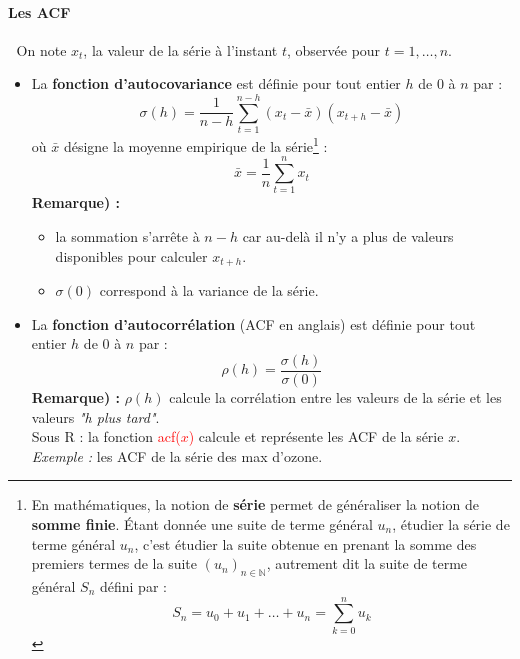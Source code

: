 \paragraph{Les ACF}\textcolor{white}{.}\newline
On note $x_{t}$, la valeur de la série à l'instant $t$, observée pour $t=1,\dots,n$.
\begin{itemize}
\item La \textbf{fonction d'autocovariance} est définie pour tout entier $h$ de $0$ à $n$ par :
$$\sigma(h) = \frac{1}{n-h} \sum_{t=1}^{n-h}(x_{t}-\bar{x})(x_{t+h}-\bar{x})$$
où $\bar{x}$ désigne la moyenne empirique de la série\footnote{
En mathématiques, la notion de \textbf{série} permet de généraliser la notion de \textbf{somme finie}.\newline
Étant donnée une suite de terme général $u_{n}$, étudier la série de terme général $u_{n}$, c'est étudier la suite obtenue en prenant la somme des premiers termes de la suite $(u_{n})_{n\in\mathbb{N}}$, autrement dit la suite de terme général $S_{n}$ défini par :
$$S_{n} = u_{0} + u_{1} + \dots + u_{n} = \sum_{k=0}^{n} u_{k}$$} : 
$$\bar{x} = \frac{1}{n} \sum_{t=1}^{n} x_{t}$$
\textbf{Remarque) :}
\begin{itemize}
\item la sommation s'arrête à $n - h$ car au-delà il n'y a plus de valeurs disponibles pour calculer $x_{t+h}$.
\item $\sigma(0)$ correspond à la variance de la série.
\end{itemize}
\item La \textbf{fonction d'autocorrélation} (ACF en anglais) est définie pour tout entier $h$ de $0$ à $n$ par :
$$\rho(h)=\frac{\sigma(h)}{\sigma(0)}$$
\textbf{Remarque) : } $\rho(h)$ calcule la corrélation entre les valeurs de la série et les valeurs \textit{"h plus tard"}.\newline
\\
Sous R : la fonction \textcolor{red}{acf($x$)} calcule et représente les ACF de la série $x$.\newline
\textit{Exemple :} les ACF de la série des max d'ozone.

\end{itemize}
